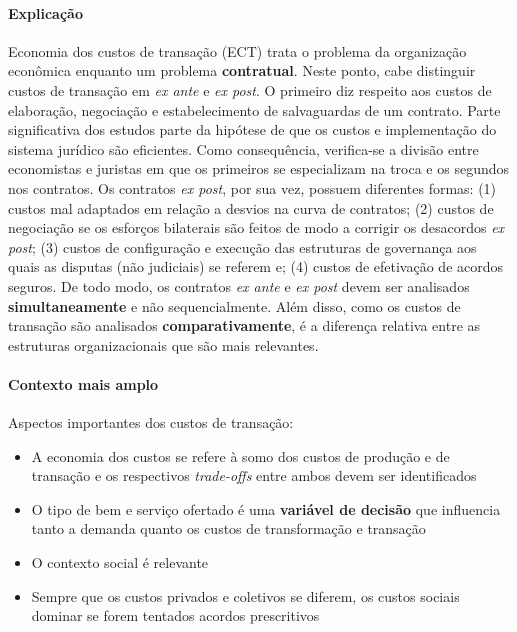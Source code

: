 \paragraph*{Explicação}

Economia dos custos de transação (ECT) trata o problema da organização econômica enquanto um problema \textbf{contratual}. Neste ponto, cabe distinguir custos de transação em \textit{ex ante} e \textit{ex post}. O primeiro diz respeito aos custos de elaboração, negociação e estabelecimento de salvaguardas de um contrato. Parte significativa dos estudos parte da hipótese de que os custos e implementação do sistema jurídico são eficientes. Como consequência, verifica-se a divisão entre economistas e juristas em que os primeiros se especializam na troca e os segundos nos contratos. Os contratos \textit{ex post}, por sua vez, possuem diferentes formas:
	(1) custos mal adaptados em relação a desvios na curva de contratos;
	(2) custos de negociação se os esforços bilaterais são feitos de modo a corrigir os desacordos \textit{ex post};
	(3) custos de configuração e execução das estruturas de governança aos quais as disputas (não judiciais) se referem e;
	(4) custos de efetivação de acordos seguros.
De todo modo, os contratos \textit{ex ante} e \textit{ex post} devem ser analisados \textbf{simultaneamente} e não sequencialmente. Além disso, como os custos de transação são analisados \textbf{comparativamente}, é a diferença relativa entre as estruturas organizacionais que são mais relevantes.

\paragraph*{Contexto mais amplo}

Aspectos importantes dos custos de transação:

\begin{itemize}
	\item A economia dos custos se refere à somo dos custos de produção e de transação e os respectivos \textit{trade-offs} entre ambos devem ser identificados
	\item O tipo de bem e serviço ofertado é uma \textbf{variável de decisão} que influencia tanto a demanda quanto os custos de transformação e transação
	\item O contexto social é relevante
	\item Sempre que os custos privados e coletivos se diferem, os custos sociais dominar se forem tentados acordos prescritivos
\end{itemize}


